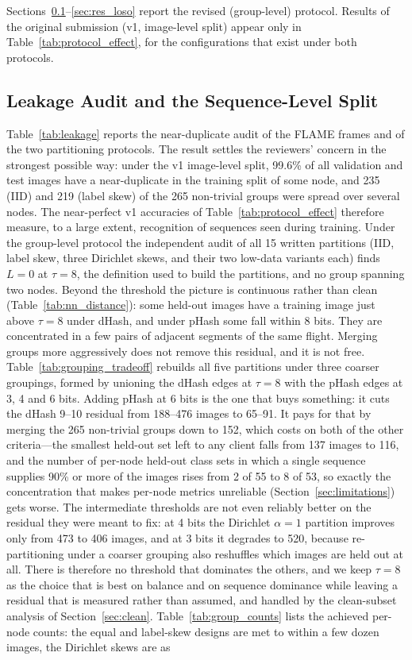 \documentclass[journal]{IEEEtran}
\begin{document}
Sections~\ref{sec:res_leakage}--\ref{sec:res_loso} report the revised (group-level) protocol. Results of the original submission (v1, image-level split) appear only in Table~\ref{tab:protocol_effect}, for the configurations that exist under both protocols.

\subsection{Leakage Audit and the Sequence-Level Split}
\label{sec:res_leakage}

Table~\ref{tab:leakage} reports the near-duplicate audit of the FLAME frames and of the two partitioning protocols. The result settles the reviewers' concern in the strongest possible way: under the v1 image-level split, 99.6\% of all validation and test images have a near-duplicate in the training split of some node, and 235 (IID) and 219 (label skew) of the 265 non-trivial groups were spread over several nodes. The near-perfect v1 accuracies of Table~\ref{tab:protocol_effect} therefore measure, to a large extent, recognition of sequences seen during training. Under the group-level protocol the independent audit of all 15 written partitions (IID, label skew, three Dirichlet skews, and their two low-data variants each) finds $L=0$ at $\tau=8$, the definition used to build the partitions, and no group spanning two nodes. Beyond the threshold the picture is continuous rather than clean (Table~\ref{tab:nn_distance}): some held-out images have a training image just above $\tau=8$ under dHash, and under pHash some fall within 8 bits. They are concentrated in a few pairs of adjacent segments of the same flight. Merging groups more aggressively does not remove this residual, and it is not free. Table~\ref{tab:grouping_tradeoff} rebuilds all five partitions under three coarser groupings, formed by unioning the dHash edges at $\tau=8$ with the pHash edges at 3, 4 and 6 bits. Adding pHash at 6 bits is the one that buys something: it cuts the dHash 9--10 residual from 188--476 images to 65--91. It pays for that by merging the 265 non-trivial groups down to 152, which costs on both of the other criteria---the smallest held-out set left to any client falls from 137 images to 116, and the number of per-node held-out class sets in which a single sequence supplies 90\% or more of the images rises from 2 of 55 to 8 of 53, so exactly the concentration that makes per-node metrics unreliable (Section~\ref{sec:limitations}) gets worse. The intermediate thresholds are not even reliably better on the residual they were meant to fix: at 4 bits the Dirichlet $\alpha{=}1$ partition improves only from 473 to 406 images, and at 3 bits it degrades to 520, because re-partitioning under a coarser grouping also reshuffles which images are held out at all. There is therefore no threshold that dominates the others, and we keep $\tau=8$ as the choice that is best on balance and on sequence dominance while leaving a residual that is measured rather than assumed, and handled by the clean-subset analysis of Section~\ref{sec:clean}. Table~\ref{tab:group_counts} lists the achieved per-node counts: the equal and label-skew designs are met to within a few dozen images, the Dirichlet skews are as 
\end{document}
